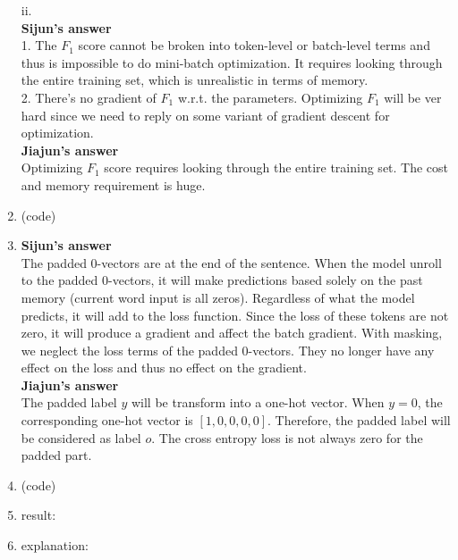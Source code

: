 \documentclass[10pt]{article}
\begin{document}
\begin{enumerate}[label=(\alph*)]
ii.\\
\textbf{Sijun's answer}\\
1. The $F_1$ score cannot be broken into token-level or batch-level terms and thus is impossible to do mini-batch optimization. It requires looking through the entire training set, which is unrealistic in terms of memory. \\
2. There's no gradient of $F_1$ w.r.t. the parameters. Optimizing $F_1$ will be ver hard since we need to reply on some variant of gradient descent for optimization.\\
\textbf{Jiajun's answer}\\
Optimizing $F_1$ score requires looking through the entire training set. The cost and memory requirement is huge.

\item
(code)

\item
\textbf{Sijun's answer}\\
The padded 0-vectors are at the end of the sentence. When the model unroll to the padded 0-vectors, it will make predictions based solely on the past memory (current word input is all zeros). Regardless of what the model predicts, it will add to the loss function. Since the loss of these tokens are not zero, it will produce a gradient and affect the batch gradient. With masking, we neglect the loss terms of the padded 0-vectors. They no longer have any effect on the loss and thus no effect on the gradient.\\
\textbf{Jiajun's answer}\\
The padded label $y$ will be transform into a one-hot vector.
When $y=0$, the corresponding one-hot vector is $[1, 0, 0, 0, 0]$.
Therefore, the padded label will be considered as label $o$.
The cross entropy loss is not always zero for the padded part.

\item
(code)

\item
result:

\item
explanation:

\end{enumerate}
\clearpage
\end{document}
